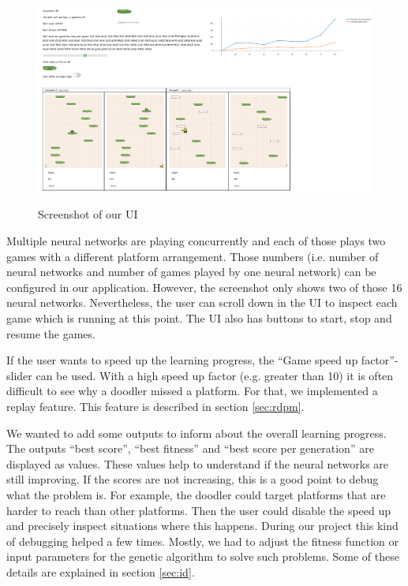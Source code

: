\documentclass[a4paper,12pt,pagesize,headsepline,bibtotoc,titlepage,abstracton]{scrartcl}
\begin{document}
\begin{figure}[h]
\begin{center}
\includegraphics*[width=1\textwidth]{images/ui}\\
\caption{Screenshot of our UI}
\label{abb:ui}
\end{center}
\end{figure}

Multiple neural networks are playing concurrently and each of those plays two games with a different platform arrangement. Those numbers (i.e. number of neural networks and number of games played by one neural network) can be configured in our application. However, the screenshot only shows two of those 16 neural networks. Nevertheless, the user can scroll down in the UI to inspect each game which is running at this point. The UI also has buttons to start, stop and resume the games.

If the user wants to speed up the learning progress, the ``Game speed up factor''-slider can be used. With a high speed up factor (e.g. greater than 10) it is often difficult to see why a doodler missed a platform. For that, we implemented a replay feature. This feature is described in section \ref{sec:rdpm}.

We wanted to add some outputs to inform about the overall learning progress. The outputs ``best score'', ``best fitness'' and ``best score per generation'' are displayed as values. These values help to understand if the neural networks are still improving. If the scores are not increasing, this is a good point to debug what the problem is. For example, the doodler could target platforms that are harder to reach than other platforms. Then the user could disable the speed up and  precisely inspect situations where this happens. During our project this kind of debugging helped a few times. Mostly, we had to adjust the fitness function or input parameters for the genetic algorithm to solve such problems. Some of these details are explained in section \ref{sec:id}.
\end{document}
